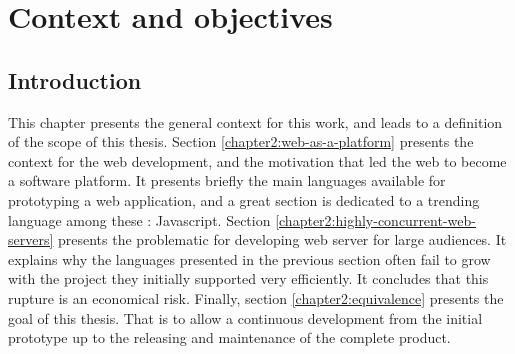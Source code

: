 \chapter{Context and objectives} \label{chapter2}
\minitoc
\eject

\section{Introduction}

This chapter presents the general context for this work, and leads to a definition of the scope of this thesis.
Section \ref{chapter2:web-as-a-platform} presents the context for the web development, and the motivation that led the web to become a software platform.
It presents briefly the main languages available for prototyping a web application, and a great section is dedicated to a trending language among these : Javascript.
Section \ref{chapter2:highly-concurrent-web-servers} presents the problematic for developing web server for large audiences.
It explains why the languages presented in the previous section often fail to grow with the project they initially supported very efficiently.
It concludes that this rupture is an economical risk.
Finally, section \ref{chapter2:equivalence} presents the goal of this thesis.
That is to allow a continuous development from the initial prototype up to the releasing and maintenance of the complete product.



